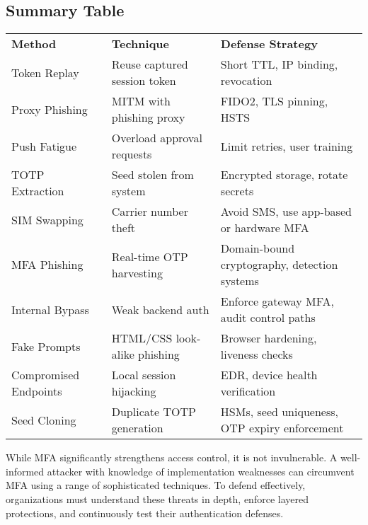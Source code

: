 \subsection{\textbf{Summary Table}}

\begin{table}
\centering

\begin{tabular}{l l l}
\textbf{Method} & \textbf{Technique} & \textbf{Defense Strategy} \\
Token Replay & Reuse captured session token & Short TTL, IP binding, revocation \\
Proxy Phishing & MITM with phishing proxy & FIDO2, TLS pinning, HSTS \\
Push Fatigue & Overload approval requests & Limit retries, user training \\
TOTP Extraction & Seed stolen from system & Encrypted storage, rotate secrets \\
SIM Swapping & Carrier number theft & Avoid SMS, use app-based or hardware MFA \\
MFA Phishing & Real-time OTP harvesting & Domain-bound cryptography, detection systems \\
Internal Bypass & Weak backend auth & Enforce gateway MFA, audit control paths \\
Fake Prompts & HTML/CSS look-alike phishing & Browser hardening, liveness checks \\
Compromised Endpoints & Local session hijacking & EDR, device health verification \\
Seed Cloning & Duplicate TOTP generation & HSMs, seed uniqueness, OTP expiry enforcement \\

\end{tabular}

\end{table}

While MFA significantly strengthens access control, it is not invulnerable. A well-informed attacker with knowledge of implementation weaknesses can circumvent MFA using a range of sophisticated techniques. To defend effectively, organizations must understand these threats in depth, enforce layered protections, and continuously test their authentication defenses.

 